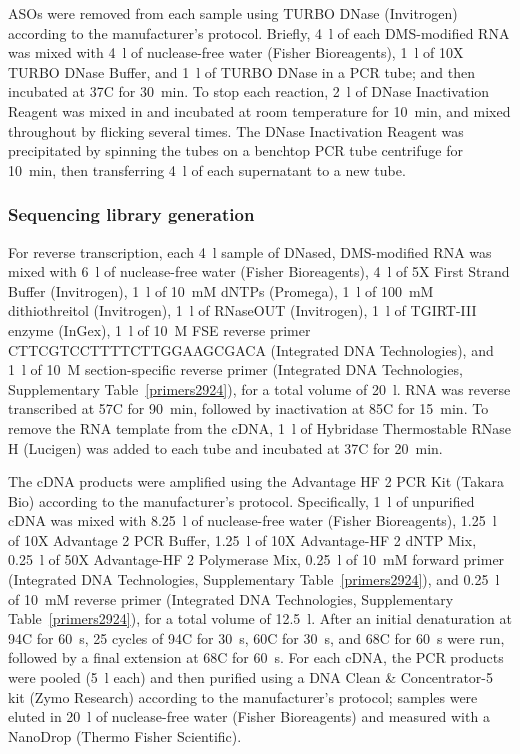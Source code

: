 \documentclass[main.tex]{subfiles}
\begin{document}
ASOs were removed from each sample using TURBO DNase (Invitrogen) according to the manufacturer's protocol.
Briefly, 4~\textmu l of each DMS-modified RNA was mixed with 4~\textmu l of nuclease-free water (Fisher Bioreagents), 1~\textmu l of 10X TURBO DNase Buffer, and 1~\textmu l of TURBO DNase in a PCR tube; and then incubated at 37\textdegree C for 30~min.
To stop each reaction, 2~\textmu l of DNase Inactivation Reagent was mixed in and incubated at room temperature for 10~min, and mixed throughout by flicking several times.
The DNase Inactivation Reagent was precipitated by spinning the tubes on a benchtop PCR tube centrifuge for 10~min, then transferring 4~\textmu l of each supernatant to a new tube.

\subsubsection{Sequencing library generation}

For reverse transcription, each 4~\textmu l sample of DNased, DMS-modified RNA was mixed with 6~\textmu l of nuclease-free water (Fisher Bioreagents), 4~\textmu l of 5X First Strand Buffer (Invitrogen), 1~\textmu l of 10~mM dNTPs (Promega), 1~\textmu l of 100~mM dithiothreitol (Invitrogen), 1~\textmu l of RNaseOUT (Invitrogen), 1~\textmu l of TGIRT-III enzyme (InGex), 1~\textmu l of 10~\textmu M FSE reverse primer CTTCGTCCTTTTCTTGGAAGCGACA (Integrated DNA Technologies), and 1~\textmu l of 10~\textmu M section-specific reverse primer (Integrated DNA Technologies, Supplementary Table~\ref{primers2924}), for a total volume of 20~\textmu l.
RNA was reverse transcribed at 57\textdegree C for 90~min, followed by inactivation at 85\textdegree C for 15~min.
To remove the RNA template from the cDNA, 1~\textmu l of Hybridase Thermostable RNase H (Lucigen) was added to each tube and incubated at 37\textdegree C for 20~min.

The cDNA products were amplified using the Advantage HF 2 PCR Kit (Takara Bio) according to the manufacturer's protocol.
Specifically, 1~\textmu l of unpurified cDNA was mixed with 8.25~\textmu l of nuclease-free water (Fisher Bioreagents), 1.25~\textmu l of 10X Advantage 2 PCR Buffer, 1.25~\textmu l of 10X Advantage-HF 2 dNTP Mix, 0.25~\textmu l of 50X Advantage-HF 2 Polymerase Mix, 0.25~\textmu l of 10~mM forward primer (Integrated DNA Technologies, Supplementary Table~\ref{primers2924}), and 0.25~\textmu l of 10~mM reverse primer (Integrated DNA Technologies, Supplementary Table~\ref{primers2924}), for a total volume of 12.5~\textmu l.
After an initial denaturation at 94\textdegree C for 60~s, 25 cycles of 94\textdegree C for 30~s, 60\textdegree C for 30~s, and 68\textdegree C for 60~s were run, followed by a final extension at 68\textdegree C for 60~s.
For each cDNA, the PCR products were pooled (5~\textmu l each) and then purified using a DNA Clean \& Concentrator-5 kit (Zymo Research) according to the manufacturer's protocol; samples were eluted in 20~\textmu l of nuclease-free water (Fisher Bioreagents) and measured with a NanoDrop (Thermo Fisher Scientific).
\end{document}
